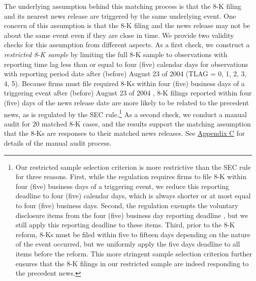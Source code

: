 \documentclass[letterpaper,11pt]{article}
\begin{document}
\begin{spacing}{1.5}
The underlying assumption behind this matching process is that the 8-K filing and its nearest news release are triggered by the same underlying event. One concern of this assumption is that the 8-K filing and the news release may not be about the same event even if they are close in time. We provide two validity checks for this assumption from different aspects. As a first check, we construct a \textit{restricted 8-K sample} by limiting the full 8-K sample to observations with reporting time lag less than or equal to four (five) calendar days for observations with reporting period date after (before) August 23 of 2004 (TLAG = 0, 1, 2, 3, 4, 5). Because firms must file required 8-Ks within four (five) business days of a triggering event after (before) August 23 of 2004 , 8-K filings reported within four (five) days of the news release date are more likely to be related to the precedent news, as is regulated by the SEC rule.\footnote{Our restricted sample selection criterion is more restrictive than the SEC rule for three reasons. First, while the regulation requires firms to file 8-K within four (five) business days of a triggering event, we reduce this reporting deadline to four (five) calendar days, which is always shorter or at most equal to four (five) business days. Second, the regulation exempts the voluntary disclosure items from the four (five) business day reporting deadline \cite{heMeasuringDisclosureUsing2020}, but we still apply this reporting deadline to these items. Third, prior to the 8-K reform, 8-Ks must be filed within five to fifteen days depending on the nature of the event occurred, but we uniformly apply the five days deadline to all items before the reform. This more stringent sample selection criterion further ensures that the 8-K filings in our restricted sample are indeed responding to the precedent news.} As a second check, we conduct a manual audit for 20 matched 8-K cases, and the results support the matching assumption that the 8-Ks are responses to their matched news releases. See \hyperref[appc]{Appendix C} for details of the manual audit process.


\end{spacing}
\end{document}
